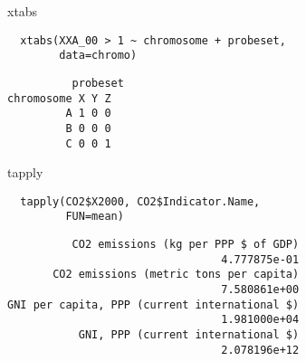 \documentclass[xcolor={usenames,svgnames,dvipsnames}]{beamer}
\begin{document}
\begin{frame}[fragile,label=sec-3-3]{xtabs}
 \lstset{language=R,label= ,caption= ,numbers=none}
\begin{lstlisting}
  xtabs(XXA_00 > 1 ~ chromosome + probeset,
        data=chromo)
\end{lstlisting}

\begin{verbatim}
          probeset
chromosome X Y Z
         A 1 0 0
         B 0 0 0
         C 0 0 1
\end{verbatim}
\end{frame}

\begin{frame}[fragile,label=sec-3-4]{tapply}
 \lstset{language=R,label= ,caption= ,numbers=none}
\begin{lstlisting}
  tapply(CO2$X2000, CO2$Indicator.Name,
         FUN=mean)
\end{lstlisting}

\begin{verbatim}
          CO2 emissions (kg per PPP $ of GDP) 
                                 4.777875e-01 
       CO2 emissions (metric tons per capita) 
                                 7.580861e+00 
GNI per capita, PPP (current international $) 
                                 1.981000e+04 
           GNI, PPP (current international $) 
                                 2.078196e+12
\end{verbatim}
\end{frame}
\end{document}
